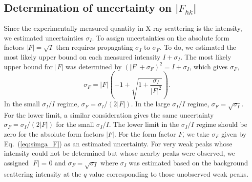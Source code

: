 \subsection{Determination of uncertainty on $|F_{hk}|$}
Since the experimentally measured quantity in X-ray scattering is the intensity,
we estimated uncertainties $\sigma_I$. To assign uncertainties on the absolute 
form factors $|F|=\sqrt{I}$ then requires propagating $\sigma_I$ to $\sigma_F$.
To do, we estimated the most likely upper bound on each measured intensity 
$I+\sigma_I$. The most likely upper bound for $|F|$ was determined by
$(|F|+\sigma_F)^2=I+\sigma_I$, which gives $\sigma_F$,
\begin{equation}
  \sigma_F=|F|(-1+\sqrt{1+\frac{\sigma_I}{|F|^2}}).
\end{equation}
In the small $\sigma_I/I$ regime, $\sigma_F=\sigma_I/(2|F|)$. In the 
large $\sigma_I/I$ regime, $\sigma_F=\sqrt{\sigma_I}$. For the lower limit,
a similar consideration gives the same uncertainty $\sigma_F=\sigma_I/(2|F|)$
for the small $\sigma_I/I$. The lower limit in the $\sigma_I/I$ regime
should be zero for the absolute form factors $|F|$. For the form factor $F$,
we take $\sigma_F$ given by Eq.~(\ref{eq:simga_F}) as an estimated 
uncertainty. For very weak peaks whose intensity could not be determined but
whose nearby peaks were observed, we assigned $|F|$ = 0 and 
$\sigma_F = \sqrt{\sigma_I}$ where $\sigma_I$ was estimated based on the
background scattering intensity at the $q$ value corresponding to those
unobserved weak peaks. 


\newpage
